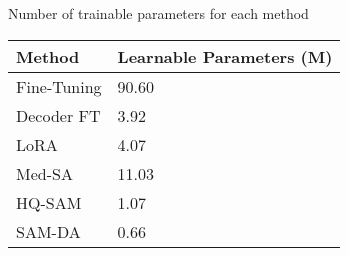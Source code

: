 \begin{margintable}[]\small
\caption{Number of trainable parameters for each method}
\label{tab:trainable_params}
\begin{tabular}{@{}p{1.75cm}P{2cm}@{}}
\toprule
{Method}       & {Learnable Parameters (M)}\\ \midrule
Fine-Tuning                         & 90.60     \\
Decoder FT                          & 3.92      \\
LoRA~{\footnotesize\parencite{hu2022lora}}              & 4.07      \\
Med-SA~{\footnotesize\parencite{wu2023medical}}         & 11.03     \\
HQ-SAM~{\footnotesize\parencite{ke2024segment}}         & 1.07      \\
SAM-DA                              & 0.66      \\ \bottomrule
\end{tabular}
\end{margintable}
